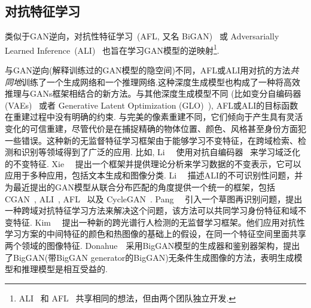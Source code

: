 \subsection{对抗特征学习}
\label{sec:afl}
类似于GAN逆向，对抗性特征学习~(AFL, 又名 BiGAN)~\cite{donahue2016adversarial,li2018domain,xie2017controllable}  或 Adversarially Learned Inference~(ALI)~\cite{dumoulin2016adversarially, du2018multi, belghazi2018hierarchical} 也旨在学习GAN模型的逆映射\footnote{ALI~\cite{dumoulin2016adversarially} 和 AFL~\cite{donahue2016adversarial} 共享相同的想法，但由两个团队独立开发.}. 

与GAN逆向(解释训练过的GAN模型的隐空间)不同，AFL或ALI用对抗的方法\emph{共同地}训练了一个生成网络和一个推理网络.这种深度生成模型也构成了一种将高效推理与GANs框架相结合的新方法。与其他深度生成模型不同 (比如变分自编码器 (VAEs)~\cite{doersch2016vae} 或者 Generative Latent Optimization (GLO)~\cite{bojanowski2017optimizing}), AFL或ALI的目标函数在重建过程中没有明确的约束. 
与完美的像素重建不同，它们倾向于产生具有灵活变化的可信重建，尽管代价是在捕捉精确的物体位置、颜色、风格甚至身份方面犯一些错误。这种新的无监督特征学习框架由于能够学习不变特征，在跨域检索、检测和识别等领域得到了广泛的应用.
比如, Li~\etal~\cite{li2018domain} 使用对抗自编码器~\cite{makhzani2015aae} 来学习域泛化的不变特征. 
Xie~\etal~\cite{xie2017controllable} 提出一个框架并提供理论分析来学习数据的不变表示，它可以应用于多种应用，包括文本生成和图像分类.
Li~\etal~\cite{li2017alice} 描述ALI的不可识别性问题，并为最近提出的GAN模型从联合分布匹配的角度提供一个统一的框架，包括 CGAN~\cite{mirza2014conditional}, ALI~\cite{dumoulin2016adversarially}, AFL~\cite{donahue2016adversarial} 以及  CycleGAN~\cite{zhu2017toward}.
Pang~\etal~\cite{pang2018reid} 引入一个草图再识别问题，提出一种跨域对抗特征学习方法来解决这个问题，该方法可以共同学习身份特征和域不变特征.
Kim~\etal~\cite{kim2019pedestrain} 提出一种新的跨光谱行人检测的无监督学习框架。他们应用对抗性学习方案的中间特征的颜色和热图像的基础上的假设，在同一个特征空间里面共享两个领域的图像特征.
Donahue~\etal~\cite{donahue2019large}采用BigGAN模型的生成器和鉴别器架构，提出了BigGAN(带BigGAN generator的BigGAN)无条件生成图像的方法，表明生成模型和推理模型是相互受益的.

